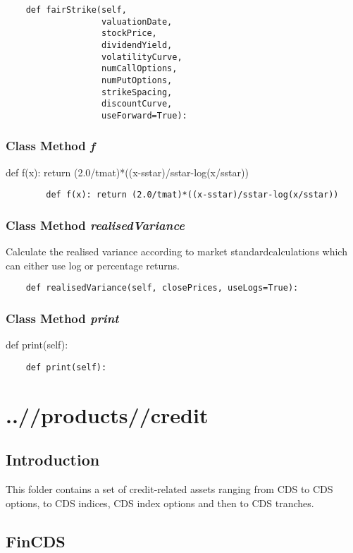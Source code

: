 \documentclass[twoside,11pt]{book}
\begin{document}
\begin{lstlisting}
    def fairStrike(self,
                   valuationDate,
                   stockPrice,
                   dividendYield,
                   volatilityCurve,
                   numCallOptions,
                   numPutOptions,
                   strikeSpacing,
                   discountCurve,
                   useForward=True):
\end{lstlisting}

\subsection{Class Method {\it f}}
def f(x): return (2.0/tmat)*((x-sstar)/sstar-log(x/sstar))

\begin{lstlisting}
        def f(x): return (2.0/tmat)*((x-sstar)/sstar-log(x/sstar))
\end{lstlisting}

\subsection{Class Method {\it realisedVariance}}
Calculate the realised variance according to market standardcalculations which can either use log or percentage returns.

\begin{lstlisting}
    def realisedVariance(self, closePrices, useLogs=True):
\end{lstlisting}

\subsection{Class Method {\it print}}
def print(self):

\begin{lstlisting}
    def print(self):
\end{lstlisting}


\chapter{..//products//credit}
\section{Introduction}
This folder contains a set of credit-related assets ranging from CDS to CDS options, to CDS indices, CDS index options and then to CDS tranches. 
\newpage
\section{FinCDS}
\end{document}
